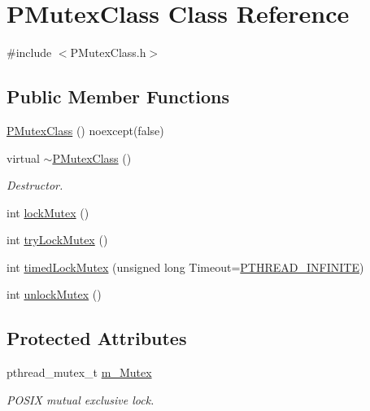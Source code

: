 \hypertarget{classPMutexClass}{}\section{P\+Mutex\+Class Class Reference}
\label{classPMutexClass}


{\ttfamily \#include $<$P\+Mutex\+Class.\+h$>$}

\subsection*{Public Member Functions}
\begin{DoxyCompactItemize}
\item 
\hyperlink{classPMutexClass_a688e581b72b3b5315e7b2a36d1c251a1}{P\+Mutex\+Class} () noexcept(false)
\item 
virtual \hyperlink{classPMutexClass_aa323680c6acc1f99f96489856c115768}{$\sim$\+P\+Mutex\+Class} ()
\begin{DoxyCompactList}\small\item\em Destructor. \end{DoxyCompactList}\item 
int \hyperlink{classPMutexClass_a6fb1831791f79d71be6fb4d4bb5b887e}{lock\+Mutex} ()
\item 
int \hyperlink{classPMutexClass_a21eab0587c0a3b769f952b5a61db8c10}{try\+Lock\+Mutex} ()
\item 
int \hyperlink{classPMutexClass_a18cc2519c5f1d0ee601af43cd400aa67}{timed\+Lock\+Mutex} (unsigned long Timeout=\hyperlink{PThreadClassLib_8h_a9d2d74d73cb5d069fbfcbcfebf42bd6e}{P\+T\+H\+R\+E\+A\+D\+\_\+\+I\+N\+F\+I\+N\+I\+TE})
\item 
int \hyperlink{classPMutexClass_a95b98e4a3823affac8caed41e5522124}{unlock\+Mutex} ()
\end{DoxyCompactItemize}
\subsection*{Protected Attributes}
\begin{DoxyCompactItemize}
\item 
pthread\+\_\+mutex\+\_\+t \hyperlink{classPMutexClass_a6f1080f8c78d754f60b4e284d879c06b}{m\+\_\+\+Mutex}
\begin{DoxyCompactList}\small\item\em P\+O\+S\+IX mutual exclusive lock. \end{DoxyCompactList}\end{DoxyCompactItemize}


